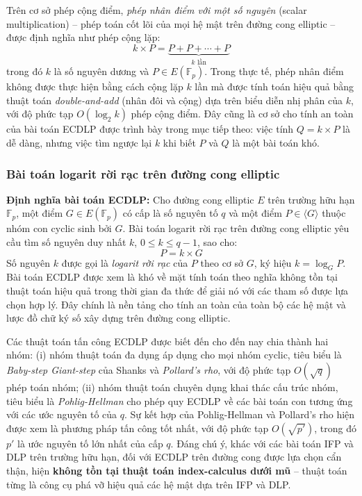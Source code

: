Trên cơ sở phép cộng điểm, \textit{phép nhân điểm với một số nguyên} (scalar multiplication) -- phép toán cốt lõi của mọi hệ mật trên đường cong elliptic -- được định nghĩa như phép cộng lặp:
\begin{equation}
k \times P = \underbrace{P + P + \cdots + P}_{k \text{ lần}}
\label{eq:scalar-mult}
\end{equation}
trong đó $k$ là số nguyên dương và $P \in E(\mathbb{F}_p)$. Trong thực tế, phép nhân điểm không được thực hiện bằng cách cộng lặp $k$ lần mà được tính toán hiệu quả bằng thuật toán \textit{double-and-add} (nhân đôi và cộng) dựa trên biểu diễn nhị phân của $k$, với độ phức tạp $O(\log_2 k)$ phép cộng điểm. Đây cũng là cơ sở cho tính an toàn của bài toán ECDLP được trình bày trong mục tiếp theo: việc tính $Q = k \times P$ là dễ dàng, nhưng việc tìm ngược lại $k$ khi biết $P$ và $Q$ là một bài toán khó.

\subsubsection{Bài toán logarit rời rạc trên đường cong elliptic}

\textbf{Định nghĩa bài toán ECDLP:} Cho đường cong elliptic $E$ trên trường hữu hạn $\mathbb{F}_p$, một điểm $G \in E(\mathbb{F}_p)$ có cấp là số nguyên tố $q$ và một điểm $P \in \langle G \rangle$ thuộc nhóm con cyclic sinh bởi $G$. Bài toán logarit rời rạc trên đường cong elliptic yêu cầu tìm số nguyên duy nhất $k$, $0 \leq k \leq q - 1$, sao cho:
\begin{equation}
P = k \times G
\label{eq:ecdlp}
\end{equation}
Số nguyên $k$ được gọi là \textit{logarit rời rạc} của $P$ theo cơ sở $G$, ký hiệu $k = \log_G P$. Bài toán ECDLP được xem là khó về mặt tính toán theo nghĩa không tồn tại thuật toán hiệu quả trong thời gian đa thức để giải nó với các tham số được lựa chọn hợp lý. Đây chính là nền tảng cho tính an toàn của toàn bộ các hệ mật và lược đồ chữ ký số xây dựng trên đường cong elliptic.

Các thuật toán tấn công ECDLP được biết đến cho đến nay chia thành hai nhóm: (i) nhóm thuật toán đa dụng áp dụng cho mọi nhóm cyclic, tiêu biểu là \textit{Baby-step Giant-step} của Shanks và \textit{Pollard's rho}, với độ phức tạp $O(\sqrt{q})$ phép toán nhóm; (ii) nhóm thuật toán chuyên dụng khai thác cấu trúc nhóm, tiêu biểu là \textit{Pohlig-Hellman} cho phép quy ECDLP về các bài toán con tương ứng với các ước nguyên tố của $q$. Sự kết hợp của Pohlig-Hellman và Pollard's rho hiện được xem là phương pháp tấn công tốt nhất, với độ phức tạp $O(\sqrt{p'})$, trong đó $p'$ là ước nguyên tố lớn nhất của cấp $q$. Đáng chú ý, khác với các bài toán IFP và DLP trên trường hữu hạn, đối với ECDLP trên đường cong được lựa chọn cẩn thận, hiện \textbf{không tồn tại thuật toán index-calculus dưới mũ} -- thuật toán từng là công cụ phá vỡ hiệu quả các hệ mật dựa trên IFP và DLP.

